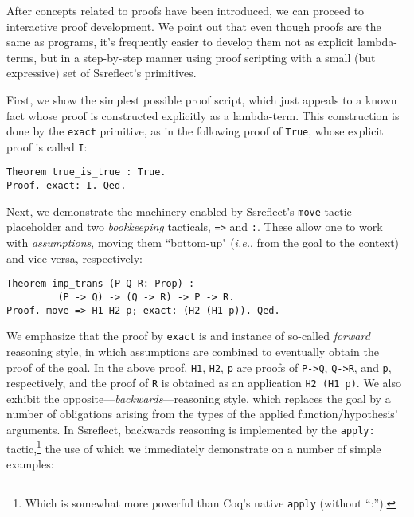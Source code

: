 \documentclass[blockstyle,preprint,nocopyrightspace]{sigplanconf}
\newcommand{\an}[1]{\textcolor{red}{(Aleks: {#1})}}
\newcommand{\code}[1]{\lstinline{#1}}
\newcommand{\ie}{\emph{i.e.}\xspace}
\begin{document}
%
After concepts related to proofs have been introduced, we can proceed
to interactive proof development. We point out that even though proofs
are the same as programs, it's frequently easier to develop them not
as explicit lambda-terms, but in a step-by-step manner using proof
scripting with a small (but expressive) set of Ssreflect's primitives.
%

First, we show the simplest possible proof script, which just appeals
to a known fact whose proof is constructed explicitly as a
lambda-term.  This construction is done by the \code{exact} primitive,
as in the following proof of \code{True}, whose explicit proof is
called \code{I}:
%
\begin{lstlisting}
Theorem true_is_true : True.
Proof. exact: I. Qed.
\end{lstlisting}
%
Next, we demonstrate the machinery enabled by Ssreflect's \code{move}
tactic placeholder and two \emph{bookkeeping} tacticals, \code{=>} and
\code{:}. These allow one to work with \emph{assumptions}, moving them
``bottom-up" (\ie, from the goal to the context) and vice versa,
respectively:
%
\begin{lstlisting}
Theorem imp_trans (P Q R: Prop) : 
         (P -> Q) -> (Q -> R) -> P -> R.
Proof. move => H1 H2 p; exact: (H2 (H1 p)). Qed.
\end{lstlisting}
%
We emphasize that the proof by \code{exact} is and instance of
so-called \emph{forward} reasoning style, in which assumptions are
combined to eventually obtain the proof of the goal. In the above
proof, \code{H1}, \code{H2}, \code{p} are proofs of \code{P->Q},
\code{Q->R}, and \code{p}, respectively, and the proof of \code{R} is
obtained as an application \code{H2 (H1 p)}. We also exhibit the
opposite---\emph{backwards}---reasoning style, which replaces the goal
by a number of obligations arising from the types of the applied
function/hypothesis' arguments. In Ssreflect, backwards reasoning is
implemented by the \code{apply:} tactic,\footnote{Which is somewhat
  more powerful than Coq's native \code{apply} (without ``:'').} the
use of which we immediately demonstrate on a number of simple
examples:
\end{document}
